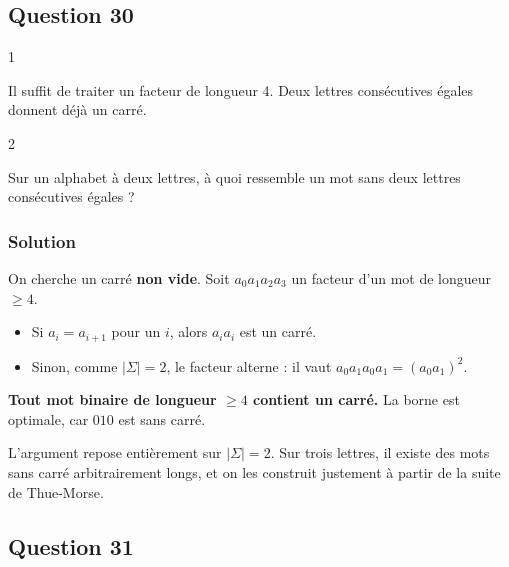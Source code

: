\documentclass[11pt,a4paper]{article}
\providecommand{\tightlist}{\setlength{\itemsep}{0pt}\setlength{\parskip}{0pt}}
\begin{document}
\hypertarget{question-30}{%
\subsection{Question 30}\label{question-30}}

\begin{indication}{1}

Il suffit de traiter un facteur de longueur 4. Deux lettres consécutives égales donnent déjà un carré.

\end{indication}

\begin{indication}{2}

Sur un alphabet à deux lettres, à quoi ressemble un mot sans deux lettres consécutives égales ?

\end{indication}

\hypertarget{solution-29}{%
\subsubsection{Solution}\label{solution-29}}

On cherche un carré \textbf{non vide}. Soit \(a_0a_1a_2a_3\) un facteur d'un mot de longueur \(\ge 4\).

\begin{itemize}
\tightlist
\item
  Si \(a_i=a_{i+1}\) pour un \(i\), alors \(a_ia_i\) est un carré.
\item
  Sinon, comme \(|\Sigma|=2\), le facteur alterne : il vaut \(a_0a_1a_0a_1=(a_0a_1)^2\).
\end{itemize}

\textbf{Tout mot binaire de longueur \(\ge 4\) contient un carré.} La borne est optimale, car \(010\) est sans carré.

\begin{methode}

L'argument repose entièrement sur \(|\Sigma|=2\). Sur trois lettres, il existe des mots sans carré arbitrairement longs, et on les construit justement à partir de la suite de Thue-Morse.

\end{methode}

\hypertarget{question-31}{%
\subsection{Question 31}\label{question-31}}
\end{document}
